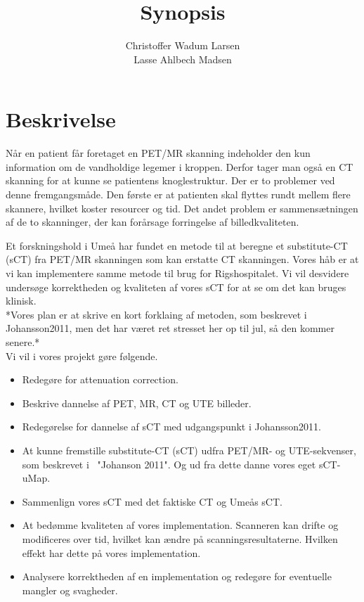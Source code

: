 \documentclass[12pt]{article}
\title{Synopsis}
\author{
Christoffer Wadum Larsen\\
Lasse Ahlbech Madsen}
\begin{document}
\maketitle


\section*{Beskrivelse}

Når en patient får foretaget en PET/MR skanning indeholder den kun
information om de vandholdige legemer i kroppen. Derfor tager man også en
CT skanning for at kunne se patientens knoglestruktur. Der er to problemer
ved denne fremgangsmåde. Den første er at patienten skal flyttes rundt
mellem flere skannere, hvilket koster resourcer og tid. Det andet problem
er sammensætningen af de to skanninger, der kan forårsage forringelse af
billedkvaliteten.

Et forskningshold i Umeå har fundet en metode til at beregne et
substitute-CT (sCT) fra PET/MR skanningen som kan erstatte CT skanningen. Vores
håb er at vi kan implementere samme metode til brug for Rigshospitalet. Vi
vil desvidere undersøge korrektheden og kvaliteten af vores sCT for at se om
det kan bruges klinisk.\\

*Vores plan er at skrive en kort forklaing af metoden, som beskrevet i
Johansson2011, men det har været ret stresset her op til jul, så den kommer
senere.*\\

Vi vil i vores projekt gøre følgende.
\begin{itemize}
    \item Redegøre for attenuation correction.
    \item Beskrive dannelse af PET, MR, CT og UTE billeder.
    \item Redegørelse for dannelse af sCT med udgangspunkt i Johansson2011.
    \item At kunne fremstille substitute-CT (sCT) udfra PET/MR- og
        UTE-sekvenser,
        som beskrevet i ~"Johanson 2011". Og ud fra dette danne vores eget 
        sCT-uMap.
    \item Sammenlign vores sCT med det faktiske CT og Umeås sCT.
    \item At bedømme kvaliteten af vores implementation. 
Scanneren kan drifte og modificeres over tid, hvilket kan ændre på
scanningsresultaterne. Hvilken effekt har dette på vores implementation.
    \item Analysere korrektheden af en implementation og redegøre for
        eventuelle mangler og svagheder.
\end{itemize}
\end{document}
